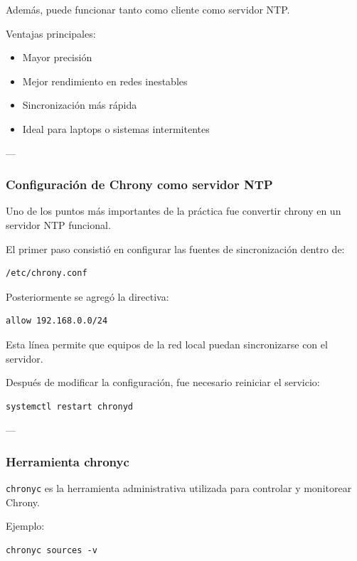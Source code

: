 \documentclass[11pt, letterpaper]{article}
\begin{document}
Además, puede funcionar tanto como cliente como servidor NTP.

Ventajas principales:

\begin{itemize}
\item Mayor precisión
\item Mejor rendimiento en redes inestables
\item Sincronización más rápida
\item Ideal para laptops o sistemas intermitentes
\end{itemize}

---
\subsubsection{Configuración de Chrony como servidor NTP}
\label{sec:orgaa48a8a}

Uno de los puntos más importantes de la práctica fue convertir chrony en un servidor NTP funcional.

El primer paso consistió en configurar las fuentes de sincronización dentro de:

\begin{verbatim}
/etc/chrony.conf
\end{verbatim}

Posteriormente se agregó la directiva:

\begin{verbatim}
allow 192.168.0.0/24
\end{verbatim}

Esta línea permite que equipos de la red local puedan sincronizarse con el servidor.

Después de modificar la configuración, fue necesario reiniciar el servicio:

\begin{verbatim}
systemctl restart chronyd
\end{verbatim}

---
\subsubsection{Herramienta chronyc}
\label{sec:org2d665bd}

\texttt{chronyc} es la herramienta administrativa utilizada para controlar y monitorear Chrony.

Ejemplo:

\begin{verbatim}
chronyc sources -v
\end{verbatim}
\end{document}
